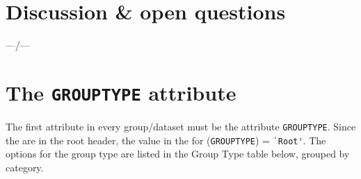 \documentclass[a4paper,10pt,bibtotoc]{scrartcl}
\begin{document}

\section{Discussion \& open questions}
\label{sec:discussion}

---/---


\section{The {\tt GROUPTYPE} attribute}
\label{sec:grouptype attribute}

The first attribute in every group/dataset must be the attribute
\verb|GROUPTYPE|. Since the {\cla} are in the root header, the value
in the {\cla} for (\verb|GROUPTYPE|) = \verb|`Root'|.  The options for
the group type are listed in the Group Type table below, grouped by
category.
\end{document}
